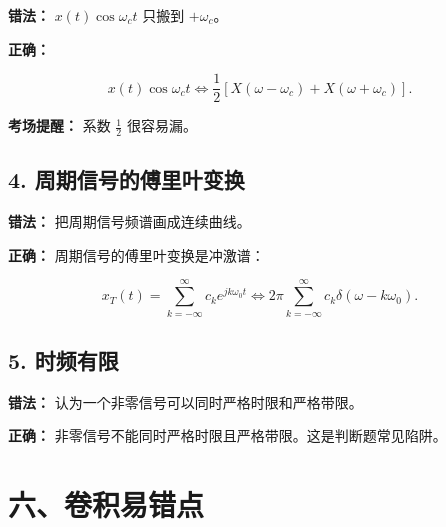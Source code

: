 \documentclass[11pt]{ctexart}
\begin{document}
\textbf{错法：} \(x(t)\cos\omega_c t\) 只搬到 \(+\omega_c\)。\par



\textbf{正确：}\par

\[

x(t)\cos\omega_c t

\Longleftrightarrow

\frac12\left[X(\omega-\omega_c)+X(\omega+\omega_c)\right].

\]



\textbf{考场提醒：} 系数 \(\frac12\) 很容易漏。\par



\subsection*{4. 周期信号的傅里叶变换}



\textbf{错法：} 把周期信号频谱画成连续曲线。\par



\textbf{正确：} 周期信号的傅里叶变换是冲激谱：\par

\[

x_T(t)=\sum_{k=-\infty}^{\infty}c_k e^{jk\omega_0t}

\Longleftrightarrow

2\pi\sum_{k=-\infty}^{\infty}c_k\delta(\omega-k\omega_0).

\]



\subsection*{5. 时频有限}



\textbf{错法：} 认为一个非零信号可以同时严格时限和严格带限。\par



\textbf{正确：} 非零信号不能同时严格时限且严格带限。这是判断题常见陷阱。\par



\section*{六、卷积易错点}
\end{document}

